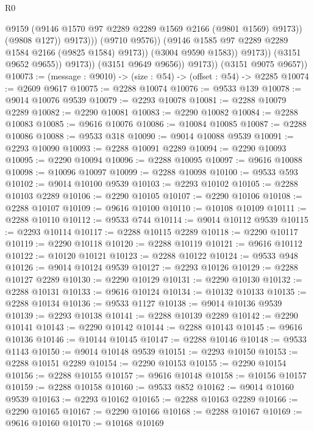 \begin{lexlean}{R0}
\begin{coremodule}
                                      @9159
                                      (@9146 @1570 @97 @2289 @2289 @1569 @2166 (@9801 @1569) @9173))
                                    (@9808 @127))
                                  @9173)))
                            (@9710 @9576))
                          (@9146 @1585 @97 @2289 @2289 @1584 @2166 (@9825 @1584) @9173))
                        (@3004 @9590 @1583))
                      @9173))
                  (@3151 @9652 @9655))
                @9173))
            (@3151 @9649 @9656))
          @9173))
      (@3151 @9075 @9657))
@10073 := (message : @9010) -> (size : @54) -> (offset : @54) -> @2285
@10074 := @2609 @9617
@10075 := @2288 @10074
@10076 := @9533 @139
@10078 := @9014 @10076 @9539
@10079 := @2293 @10078
@10081 := @2288 @10079 @2289
@10082 := @2290 @10081
@10083 := @2290 @10082
@10084 := @2288 @10083
@10085 := @9616 @10076
@10086 := @10084 @10085
@10087 := @2288 @10086
@10088 := @9533 @318
@10090 := @9014 @10088 @9539
@10091 := @2293 @10090
@10093 := @2288 @10091 @2289
@10094 := @2290 @10093
@10095 := @2290 @10094
@10096 := @2288 @10095
@10097 := @9616 @10088
@10098 := @10096 @10097
@10099 := @2288 @10098
@10100 := @9533 @593
@10102 := @9014 @10100 @9539
@10103 := @2293 @10102
@10105 := @2288 @10103 @2289
@10106 := @2290 @10105
@10107 := @2290 @10106
@10108 := @2288 @10107
@10109 := @9616 @10100
@10110 := @10108 @10109
@10111 := @2288 @10110
@10112 := @9533 @744
@10114 := @9014 @10112 @9539
@10115 := @2293 @10114
@10117 := @2288 @10115 @2289
@10118 := @2290 @10117
@10119 := @2290 @10118
@10120 := @2288 @10119
@10121 := @9616 @10112
@10122 := @10120 @10121
@10123 := @2288 @10122
@10124 := @9533 @948
@10126 := @9014 @10124 @9539
@10127 := @2293 @10126
@10129 := @2288 @10127 @2289
@10130 := @2290 @10129
@10131 := @2290 @10130
@10132 := @2288 @10131
@10133 := @9616 @10124
@10134 := @10132 @10133
@10135 := @2288 @10134
@10136 := @9533 @1127
@10138 := @9014 @10136 @9539
@10139 := @2293 @10138
@10141 := @2288 @10139 @2289
@10142 := @2290 @10141
@10143 := @2290 @10142
@10144 := @2288 @10143
@10145 := @9616 @10136
@10146 := @10144 @10145
@10147 := @2288 @10146
@10148 := @9533 @1143
@10150 := @9014 @10148 @9539
@10151 := @2293 @10150
@10153 := @2288 @10151 @2289
@10154 := @2290 @10153
@10155 := @2290 @10154
@10156 := @2288 @10155
@10157 := @9616 @10148
@10158 := @10156 @10157
@10159 := @2288 @10158
@10160 := @9533 @852
@10162 := @9014 @10160 @9539
@10163 := @2293 @10162
@10165 := @2288 @10163 @2289
@10166 := @2290 @10165
@10167 := @2290 @10166
@10168 := @2288 @10167
@10169 := @9616 @10160
@10170 := @10168 @10169

\end{coremodule}
\end{lexlean}

